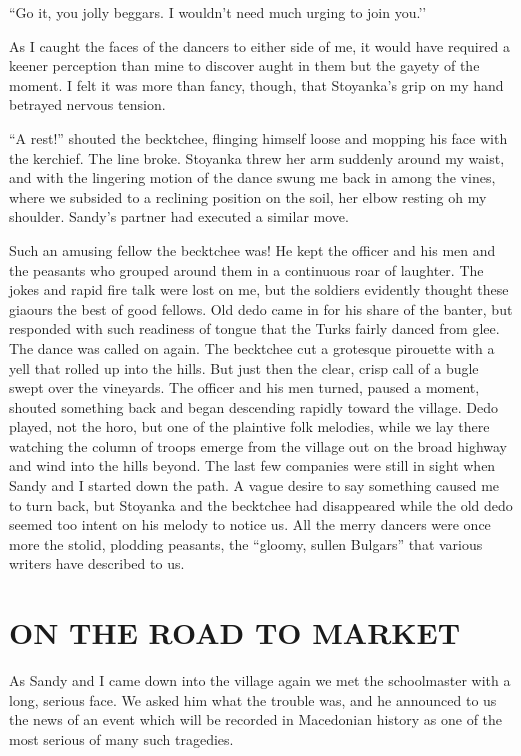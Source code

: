 \documentclass[a5paper,12pt]{book}
\begin{document}
“Go it, you jolly beggars. I wouldn’t need much urging to join you.’’

As I caught the faces of the dancers to either side of me, it would have required a keener perception than mine to discover aught in them but the gayety of the moment. I felt it was more than fancy, though, that Stoyanka’s grip on my hand betrayed nervous tension.

“A rest!” shouted the becktchee, flinging himself loose and mopping his face with the kerchief. The line broke. Stoyanka threw her arm suddenly around my waist, and with the lingering motion of the dance swung me back in among the vines, where we subsided to a reclining position on the soil, her elbow resting oh my shoulder. Sandy’s partner had executed a similar move.

Such an amusing fellow the becktchee was! He kept the officer and his men and the peasants who grouped around them in a continuous roar of laughter. The jokes and rapid fire talk were lost on me, but the soldiers evidently thought these giaours the best of good fellows. Old dedo came in for his share of the banter, but responded with such readiness of tongue that the Turks fairly danced from glee.
The dance was called on again. The becktchee cut a grotesque pirouette with a yell that rolled up into the hills. But just then the clear, crisp call of a bugle swept over the vineyards. The officer and his men turned, paused a moment, shouted something back and began descending rapidly toward the village. Dedo played, not the horo, but one of the plaintive folk melodies, while we lay there watching the column of troops emerge from the village out on the broad highway and wind into the hills beyond. The last few companies were still in sight when Sandy and I started down the path. A vague desire to say something caused me to turn back, but Stoyanka and the becktchee had disappeared while the old dedo seemed too intent on his melody to notice us. All the merry dancers were once more the stolid, plodding peasants, the “gloomy, sullen Bulgars” that various writers have described to us.


\chapter{ON THE ROAD TO MARKET}

As Sandy and I came down into the village again we met the schoolmaster with a long, serious face. We asked him what the trouble was, and he announced to us the news of an event which will be recorded in Macedonian history as one of the most serious of many such tragedies.
\end{document}
